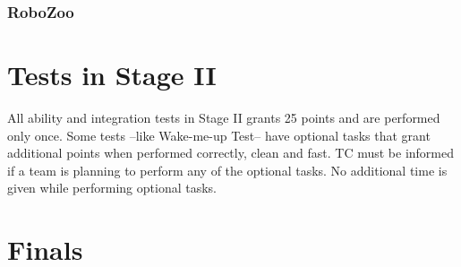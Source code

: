 \documentclass[11pt, twoside, openright, a4paper, chapterprefix]{scrbook}
\begin{document}
\subsection{RoboZoo}




\chapter{Tests in Stage II}

\begin{itshape}
All ability and integration tests in Stage II grants 25 points and are performed only once. Some tests --like Wake-me-up Test-- have optional tasks that grant additional points when performed correctly, clean and fast. TC must be informed if a team is planning to perform any of the optional tasks. No additional time is given while performing optional tasks.
\end{itshape}







\chapter{Finals}

\printabx
\printidx
\end{document}
